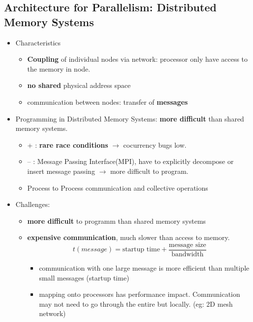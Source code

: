 \subsection{Architecture for Parallelism: Distributed Memory Systems}
\begin{itemize}
	\item Characteristics
	\begin{itemize}
		\item \textbf{Coupling} of individual nodes via network: processor only have access to the memory in node.
		\item \textbf{no shared} physical address space
		\item communication between nodes: transfer of \textbf{messages}
	\end{itemize}
	\item Programming in Distributed Memory Systems: \textbf{more difficult} than shared memory systems.
	\begin{itemize}
		\item + : \textbf{rare race conditions} $\rightarrow$ cocurrency bugs low.
		\item -- : Message Passing Interface(MPI), have to explicitly decompose or insert message passing $\rightarrow$ more difficult to program.
		\item Process to Process communication and collective operations
	\end{itemize}
	\item Challenges: 
	\begin{itemize}
		\item \textbf{more difficult} to programm than shared memory systems
		\item \textbf{expensive communication}, much slower than access to memory.
		$$t(message) = \text{startup time} + \frac{\text{message size}}{\text{bandwidth}}$$
		\begin{itemize}
			\item communication with one large message is more efficient than multiple small messages (startup time)
			\item mapping onto processors has performance impact. Communication may not need to go through the entire but locally. (eg: 2D mesh network)
		\end{itemize}
	\end{itemize}
\end{itemize}


